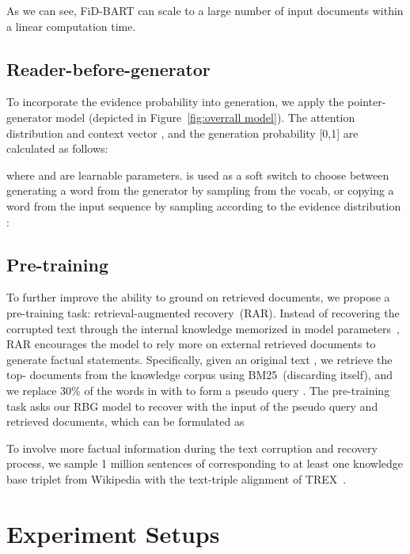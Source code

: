 \documentclass[11pt]{article}
\def\mask{{\sc[mask]}}
\begin{document}
\vspace{-3pt}
As we can see, FiD-BART can scale to a large number of input documents within a linear computation time.
\vspace{-7pt}
\subsection{Reader-before-generator}
\vspace{-5pt}
To incorporate the evidence probability into generation, we apply the pointer-generator model (depicted in Figure~\ref{fig:overrall model}). The attention distribution  and context vector , and the generation probability   [0,1] are calculated as follows:

where  and  are learnable parameters.  is used as a soft switch to choose between generating a word from the generator by sampling from the vocab, or copying a word from the input sequence by sampling according to the evidence distribution :


\vspace{-12pt}
\subsection{Pre-training}
\vspace{-5pt}
To further improve the ability to ground on retrieved documents, we propose a pre-training task: retrieval-augmented recovery~(RAR). Instead of recovering the corrupted text through the internal knowledge memorized in model parameters~\cite{raffel2020exploring,lewis2020bart}, RAR encourages the model to rely more on external retrieved documents to generate factual statements. Specifically, given an original text , we retrieve the top- documents  from the knowledge corpus using BM25~(discarding  itself), and we replace 30\% of the words in  with \mask to form a pseudo query . The pre-training task asks our RBG model to recover  with the input of the pseudo query  and  retrieved documents, which can be formulated as
\vspace{-5pt}

\noindent To involve more factual information during the text corruption and recovery process, we sample 1 million sentences of  corresponding to at least one knowledge base triplet from Wikipedia with the text-triple alignment of TREX~\cite{TREX}.  


\vspace{-10pt}
\section{Experiment Setups}
\vspace{-5pt}
\end{document}
